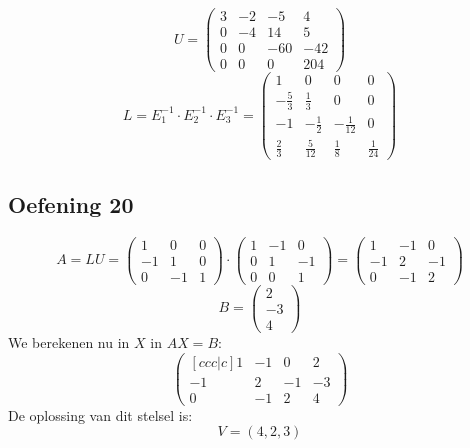 \documentclass[lineaire_algebra_oplossingen.tex]{subfiles}
\begin{document}
\[ U = 
\begin{pmatrix}
3 & -2 & -5 & 4\\
0 & -4 & 14 & 5\\
0 & 0 & -60 & -42\\
0 & 0 & 0 & 204
\end{pmatrix}
\]
\[ L = E_1^{-1} \cdot E_2^{-1} \cdot E_3^{-1}
= \begin{pmatrix}
1 & 0 & 0 & 0\\
-\frac{5}{3} & \frac{1}{3} & 0 & 0\\
-1 & -\frac{1}{2} & -\frac{1}{12} & 0\\
\frac{2}{3} & \frac{5}{12} & \frac{1}{8} & \frac{1}{24}
\end{pmatrix}
\]


\subsection{Oefening 20}
$$ A = LU = \begin{pmatrix}
1 & 0 & 0\\
-1 & 1 & 0\\
0 & -1 & 1
\end{pmatrix}
\cdot \begin{pmatrix}
1 & -1 & 0\\
0 & 1 & -1\\
0 & 0 & 1
\end{pmatrix}
=
\begin{pmatrix}
1 & -1 & 0\\
-1 & 2 & -1\\
0 & -1 & 2
\end{pmatrix}
$$
$$B = \begin{pmatrix}
2\\
-3\\
4
\end{pmatrix}
$$
We berekenen nu in $X$ in $AX = B$:
$$
\begin{pmatrix}[ccc|c]
1 & -1 & 0 & 2\\
-1 & 2 & -1 & -3\\
0 & -1 & 2 & 4
\end{pmatrix}
$$
De oplossing van dit stelsel is:\\
$$V = {(4,2,3)}$$
\end{document}
